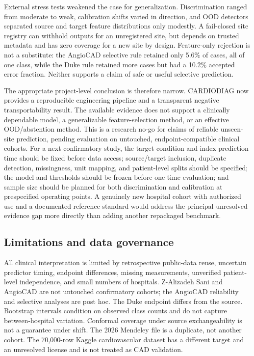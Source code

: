 \documentclass[conference]{IEEEtran}
\begin{document}
External stress tests weakened the case for generalization. Discrimination ranged from moderate to weak, calibration shifts varied in direction, and OOD detectors separated source and target feature distributions only modestly. A fail-closed site registry can withhold outputs for an unregistered site, but depends on trusted metadata and has zero coverage for a new site by design. Feature-only rejection is not a substitute: the AngioCAD selective rule retained only 5.6\% of cases, all of one class, while the Duke rule retained more cases but had a 10.2\% accepted error fraction. Neither supports a claim of safe or useful selective prediction.

The appropriate project-level conclusion is therefore narrow. CARDIODIAG now provides a reproducible engineering pipeline and a transparent negative transportability result. The available evidence does not support a clinically dependable model, a generalizable feature-selection method, or an effective OOD/abstention method. This is a research no-go for claims of reliable unseen-site prediction, pending evaluation on untouched, endpoint-compatible clinical cohorts. For a next confirmatory study, the target condition and index prediction time should be fixed before data access; source/target inclusion, duplicate detection, missingness, unit mapping, and patient-level splits should be specified; the model and thresholds should be frozen before one-time evaluation; and sample size should be planned for both discrimination and calibration at prespecified operating points. A genuinely new hospital cohort with authorized use and a documented reference standard would address the principal unresolved evidence gap more directly than adding another repackaged benchmark.

\subsection{Limitations and data governance}
All clinical interpretation is limited by retrospective public-data reuse, uncertain predictor timing, endpoint differences, missing measurements, unverified patient-level independence, and small numbers of hospitals. Z-Alizadeh Sani and AngioCAD are not untouched confirmatory cohorts; the AngioCAD reliability and selective analyses are post hoc. The Duke endpoint differs from the source. Bootstrap intervals condition on observed class counts and do not capture between-hospital variation. Conformal coverage under source exchangeability is not a guarantee under shift. The 2026 Mendeley file is a duplicate, not another cohort. The 70,000-row Kaggle cardiovascular dataset has a different target and an unresolved license and is not treated as CAD validation.
\end{document}
